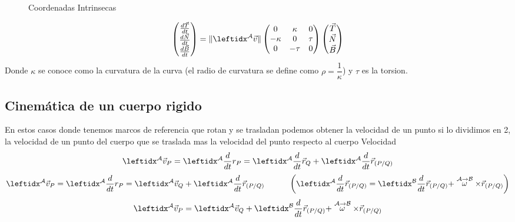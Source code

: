 \begin{figure}[!ht]
    \caption{Coordenadas Intrinsecas}
    \label{fig:intrinsecas}
\end{figure}
\[
\begin{pmatrix}
\frac{d\Vec{T}}{dt}\\ \frac{d\Vec{N}}{dt}\\ \frac{d\Vec{B}}{dt}
\end{pmatrix}
=
\|\marc{\vec{v}}{A}\|
\begin{pmatrix}
0 & \kappa & 0 \\
-\kappa & 0 & \tau \\
0 & -\tau & 0
\end{pmatrix}
\begin{pmatrix}
\Vec{T} \\
\Vec{N} \\
\Vec{B}
\end{pmatrix}
\]
Donde $\kappa$ se conoce como la curvatura de la curva (el radio de curvatura se define como $\rho=\dfrac{1}{\kappa}$) y $\tau$ es la torsion.


\subsection{Cinemática de un cuerpo rigido}
En estos casos donde tenemos marcos de referencia que rotan y se trasladan podemos obtener la velocidad de un punto si lo dividimos en 2, la velocidad de un punto del cuerpo que se traslada mas la velocidad del punto respecto al cuerpo
Velocidad
$$\marc{\vec{v}_P}{A}=\der{r_P}{A}=\der{\Vec{r}_Q}{A}+\der{\vec{r}_{(P/Q)}}{A}$$
$$\marc{\vec{v}_P}{A}=\der{r_P}{A}=\marc{\Vec{v}_Q}{A}+\der{\vec{r}_{(P/Q)}}{A}\quad\quad\quad\left(\transport{\vec{r}_{(P/Q)}}{A}{B}\right)$$
$$\marc{\vec{v}_P}{A}=\marc{\Vec{v}_Q}{A}+\transporta{\vec{r}_{(P/Q)}}{A}{B}$$

